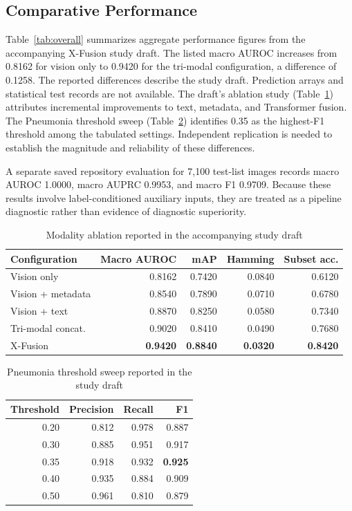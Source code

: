\documentclass[conference,letterpaper]{IEEEtran}
\begin{document}
\subsection{Comparative Performance}

Table~\ref{tab:overall} summarizes aggregate performance figures from the accompanying X-Fusion study draft. The listed macro AUROC increases from 0.8162 for vision only to 0.9420 for the tri-modal configuration, a difference of 0.1258. The reported differences describe the study draft. Prediction arrays and statistical test records are not available. The draft's ablation study (Table~\ref{tab:ablation}) attributes incremental improvements to text, metadata, and Transformer fusion. The Pneumonia threshold sweep (Table~\ref{tab:threshold}) identifies 0.35 as the highest-F1 threshold among the tabulated settings. Independent replication is needed to establish the magnitude and reliability of these differences.

A separate saved repository evaluation for 7,100 test-list images records macro AUROC 1.0000, macro AUPRC 0.9953, and macro F1 0.9709. Because these results involve label-conditioned auxiliary inputs, they are treated as a pipeline diagnostic rather than evidence of diagnostic superiority.

\begin{table}[t]
\caption{Modality ablation reported in the accompanying study draft}
\label{tab:ablation}
\centering\scriptsize
\setlength{\tabcolsep}{3pt}
\begin{tabular}{lrrrr}
\toprule
Configuration & Macro AUROC & mAP & Hamming & Subset acc.\\
\midrule
Vision only & 0.8162 & 0.7420 & 0.0840 & 0.6120\\
Vision + metadata & 0.8540 & 0.7890 & 0.0710 & 0.6780\\
Vision + text & 0.8870 & 0.8250 & 0.0580 & 0.7340\\
Tri-modal concat. & 0.9020 & 0.8410 & 0.0490 & 0.7680\\
X-Fusion & \textbf{0.9420} & \textbf{0.8840} & \textbf{0.0320} & \textbf{0.8420}\\
\bottomrule
\end{tabular}
\end{table}

\begin{table}[t]
\caption{Pneumonia threshold sweep reported in the study draft}
\label{tab:threshold}
\centering\footnotesize
\begin{tabular}{rrrr}
\toprule
Threshold & Precision & Recall & F1\\
\midrule
0.20 & 0.812 & 0.978 & 0.887\\
0.30 & 0.885 & 0.951 & 0.917\\
0.35 & 0.918 & 0.932 & \textbf{0.925}\\
0.40 & 0.935 & 0.884 & 0.909\\
0.50 & 0.961 & 0.810 & 0.879\\
\bottomrule
\end{tabular}
\end{table}
\end{document}
